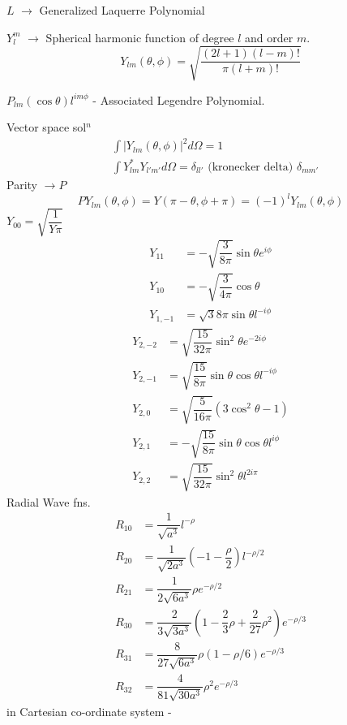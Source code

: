 $L$ $\to$ Generalized Laquerre Polynomial

\smallskip

$Y^{m}_{l}$ $\to$ Spherical harmonic function of degree $l$ and order $m$.
$$
Y_{lm}(\theta,\phi)=\sqrt{\dfrac{(2l+1)(l-m)!}{\pi(l+m)!}}
$$ 

$P_{lm}(\cos\theta)l^{im\phi}$ - Associated Legendre Polynomial.

Vector space sol$^{n}$
\begin{align*}
& \int |Y_{lm}(\theta,\phi)|^{2}d\Omega = 1\\[3pt]
& \int Y^{*}_{lm}Y_{l'm'}d\Omega=\delta_{ll'}\text{ (kronecker delta) } \delta_{mm'}
\end{align*}
Parity $\to P$
$$
P Y_{lm}(\theta,\phi)=Y(\pi-\theta,\phi+\pi)=(-1)^{l}Y_{lm}(\theta,\phi)
$$
$Y_{00}=\sqrt{\dfrac{1}{Y\pi}}$
\begin{align*}
Y_{11} &= -\sqrt{\dfrac{3}{8\pi}}\sin\theta e^{i\phi}\\[3pt]
Y_{10} &= -\sqrt{\dfrac{3}{4\pi}}\cos\theta\\[3pt]
Y_{1,-1} &= \sqrt{3}{8\pi}\sin\theta l^{-i\phi}
\end{align*}
\begin{align*}
Y_{2,-2} &= \sqrt{\dfrac{15}{32\pi}}\sin^{2}\theta e^{-2i\phi}\\[3pt]
Y_{2,-1} &= \sqrt{\dfrac{15}{8\pi}}\sin\theta \cos \theta l^{-i\phi}\\[3pt]
Y_{2,0} &= \sqrt{\dfrac{5}{16\pi}}(3\cos^{2}\theta-1)\\[3pt]
Y_{2,1} &= -\sqrt{\dfrac{15}{8\pi}}\sin \theta\cos \theta l^{i\phi}\\[3pt]
Y_{2,2} &= \sqrt{\dfrac{15}{32\pi}}\sin^{2}\theta l^{2i\pi}
\end{align*}
Radial Wave fns.
\begin{align*}
R_{10} &= \dfrac{1}{\sqrt{a^{3}}}l^{-\rho}\\[3pt]
R_{20} &= \dfrac{1}{\sqrt{2a^3}}\left(-1-\dfrac{\rho}{2}\right)l^{-\rho/2}\\[3pt]
R_{21} &= \dfrac{1}{2\sqrt{6a^3}}\rho e^{-\rho/2}\\[3pt]
R_{30} &= \dfrac{2}{3\sqrt{3a^{3}}}\left(1-\dfrac{2}{3}\rho +\dfrac{2}{27}\rho^{2}\right)e^{-\rho/3}\\[3pt]
R_{31} &= \dfrac{8}{27\sqrt{6a^{3}}}\rho \left(1-\rho/6\right)e^{-\rho/3}\\[3pt]
R_{32} &= \dfrac{4}{81\sqrt{30a^{3}}}\rho^{2}e^{-\rho/3}
\end{align*}
in Cartesian co-ordinate system -


